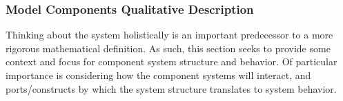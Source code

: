 \documentclass[10pt]{article}
\begin{document}


\subsubsection{Model Components Qualitative Description}

Thinking about the system holistically is an important predecessor to a more rigorous mathematical definition.  As such, this section seeks to provide some context and focus for component system structure and behavior.  Of particular importance is considering how the component systems will interact, and ports/constructs by which the system structure translates to system behavior.
\end{document}
